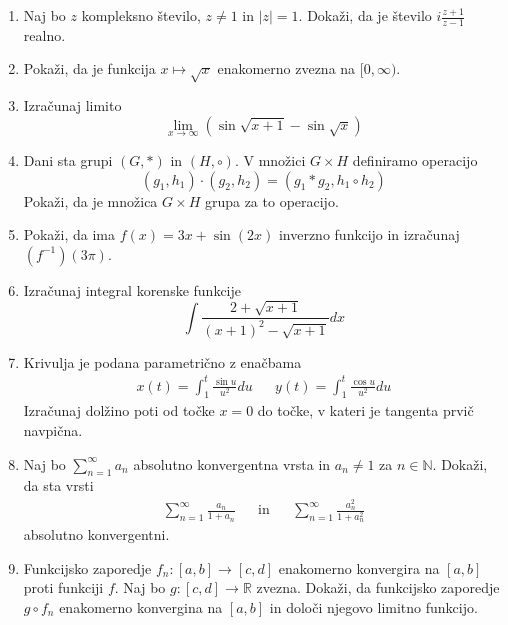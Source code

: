 \documentclass[a4paper,12pt]{article}
\begin{document}
\begin{enumerate}
    \item Naj bo \(z\) kompleksno število, \(z \neq 1\) in \(\left| z \right| = 1\). Dokaži, da je število \(i \frac{z + 1}{z - 1}\) realno.

    \item Pokaži, da je funkcija \(x \mapsto \sqrt{x}\) enakomerno zvezna na \([0, \infty)\).

    \item Izračunaj limito 
            \[
                \lim_{x \rightarrow \infty}{(\sin\sqrt{x + 1} - \sin\sqrt{x})}
            \]

    \item Dani sta grupi \((G, \ast)\) in \((H, \circ)\). V množici \(G \times H\) definiramo operacijo \[
       (g_1, h_1) \cdot (g_2, h_2) = (g_1 \ast g_2, h_1 \circ h_2) 
    \]
        Pokaži, da je množica \(G \times H\) grupa za to operacijo.

    \item Pokaži, da ima \(f(x) = 3x + \sin(2x)\) inverzno funkcijo in izračunaj \((f^{-1})(3\pi)\).

    \item Izračunaj integral korenske funkcije \[
        \int{\frac{2+\sqrt{x + 1}}{(x+1)^2 - \sqrt{x + 1}}dx}
    \]

    \item {
        Krivulja je podana parametrično z enačbama
        \begin{align}
            x(t) = \int_1^t{\frac{\sin u}{u^2}du} && y(t) = \int_1^t{\frac{\cos{u}}{u^2}du} \nonumber
        \end{align}
        Izračunaj dolžino poti od točke \(x = 0\) do točke, v kateri je tangenta prvič navpična.
    }

    \item {
        Naj bo \(\sum_{n=1}^{\infty} a_n\) absolutno konvergentna vrsta in \(a_n \neq 1\) za \(n \in \mathbb{N}\).
        Dokaži, da sta vrsti 
        \begin{align}
            \sum_{n=1}^{\infty}{\frac{a_n}{1 + a_n}} && \text{in} && \sum_{n=1}^{\infty}{\frac{a_n^2}{1 + a_n^2}} \nonumber
        \end{align}
        absolutno konvergentni.
    }
        
    \item {
        Funkcijsko zaporedje $f_n : [a,b] \rightarrow [c,d]$ enakomerno konvergira na $[a,b]$ proti funkciji $f$.
        Naj bo $g:[c,d] \rightarrow \mathbb{R}$ zvezna. Dokaži, da funkcijsko zaporedje $g \circ f_n$
        enakomerno konvergina na $[a,b]$ in določi njegovo limitno funkcijo.
    }


\end{enumerate}
\end{document}
